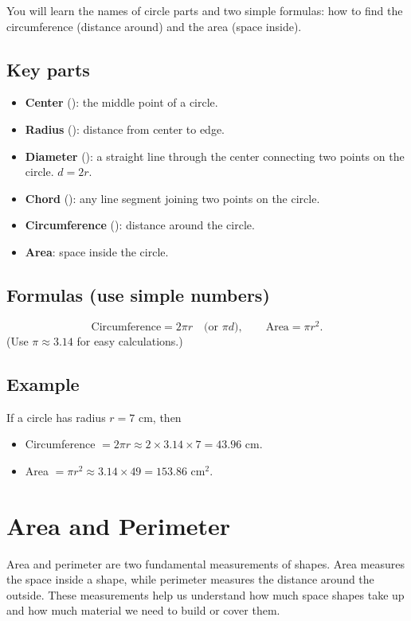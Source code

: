 You will learn the names of circle parts and two simple formulas: how to find the
circumference (distance around) and the area (space inside).

\subsection{Key parts}

\begin{itemize}
  \item \textbf{Center} (): the middle point of a circle.
  \item \textbf{Radius} (): distance from center to edge.
  \item \textbf{Diameter} (): a straight line through the center connecting two points on the circle. \(d = 2r\).
  \item \textbf{Chord} (): any line segment joining two points on the circle.
  \item \textbf{Circumference} (): distance around the circle.
  \item \textbf{Area}: space inside the circle.
\end{itemize}

\subsection{Formulas (use simple numbers)}

\[
\text{Circumference} = 2\pi r \quad\text{(or }\pi d\text{)},\qquad
\text{Area} = \pi r^{2}.
\]
(Use \(\pi \approx 3.14\) for easy calculations.)

\subsection{Example}

If a circle has radius \(r=7\) cm, then
\begin{itemize}
  \item Circumference \(= 2\pi r \approx 2\times 3.14\times 7 = 43.96\) cm.
  \item Area \(= \pi r^2 \approx 3.14\times 49 = 153.86\) cm\(^2\).
\end{itemize}


\section{Area and Perimeter}

Area and perimeter are two fundamental measurements of shapes. Area measures the
space inside a shape, while perimeter measures the distance around the outside.
These measurements help us understand how much space shapes take up and how much
material we need to build or cover them.


